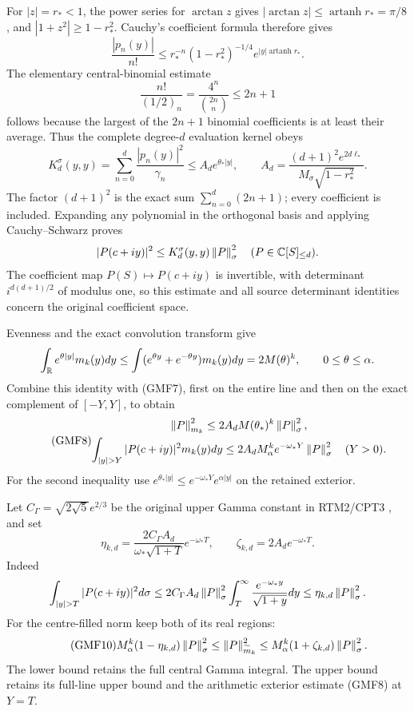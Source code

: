 For \(|z|=r_*<1\), the power series for \(\arctan z\) gives
\(|\arctan z|\le\operatorname{artanh}r_*=\pi/8\), and
\(|1+z^2|\ge1-r_*^2\).
Cauchy's coefficient formula therefore gives
\[
 \frac{|p_n(y)|}{n!}
 \le r_*^{-n}(1-r_*^2)^{-1/4}
                      e^{|y|\operatorname{artanh}r_*}.
\]
The elementary central-binomial estimate
\[
 \frac{n!}{(1/2)_n}=\frac{4^n}{\binom{2n}{n}}\le2n+1
\]
follows because the largest of the \(2n+1\) binomial coefficients
is at least their average.
Thus the complete degree-\(d\) evaluation kernel obeys
\begin{equation}\tag{GMF7}
 K_d^\sigma(y,y)=\sum_{n=0}^d\frac{|p_n(y)|^2}{\gamma_n}
 \le A_de^{\theta_*|y|},\qquad
 A_d=\frac{(d+1)^2 e^{2d\ell_*}}
               {M_\sigma\sqrt{1-r_*^2}}.
\end{equation}
The factor \((d+1)^2\) is the exact sum
\(\sum_{n=0}^d(2n+1)\); every coefficient is included.
Expanding any polynomial in the orthogonal basis and applying
Cauchy--Schwarz proves
\[
 |P(c+iy)|^2\le K_d^\sigma(y,y)\left\lVert P\right\rVert_\sigma^2
 \quad(P\in\mathbb C[S]_{\le d}).
\]
The coefficient map \(P(S)\mapsto P(c+iy)\) is invertible,
with determinant \(i^{d(d+1)/2}\) of modulus one, so this
estimate and all source determinant identities concern the
original coefficient space.

Evenness and the exact convolution transform give
\[
 \int_\mathbb R e^{\theta|y|}m_k(y)dy
 \le \int(e^{\theta y}+e^{-\theta y})m_k(y)dy
 =2M(\theta)^k,\qquad 0\le\theta\le\alpha.
\]
Combine this identity with (GMF7), first on the entire line
and then on the exact complement of \([-Y,Y]\), to obtain
\begin{equation}\tag{GMF8}
\begin{gathered}
 \norm P_{m_k}^2
 \le2A_dM(\theta_*)^k\norm P_\sigma^2,\\
 \int_{|y|>Y}|P(c+iy)|^2m_k(y)dy
 \le2A_dM_\alpha^k e^{-\omega_*Y}\norm P_\sigma^2
 \quad(Y>0).
\end{gathered}
\end{equation}
For the second inequality use
\(e^{\theta_*|y|}\le e^{-\omega_*Y}e^{\alpha|y|}\)
on the retained exterior.

Let \(C_\Gamma=\sqrt{2\sqrt5}e^{2/3}\) be the original upper
Gamma constant in RTM2/CPT3 \cite{a02gmf:providers,a02gmf:cpt}, and set
\begin{equation}\tag{GMF9}
 \eta_{k,d}=
 \frac{2C_\Gamma A_d}{\omega_*\sqrt{1+T}}e^{-\omega_*T},
 \qquad
 \zeta_{k,d}=2A_de^{-\omega_*T}.
\end{equation}
Indeed
\[
 \int_{|y|>T}|P(c+iy)|^2d\sigma
 \le2C_\Gamma A_d\norm P_\sigma^2
           \int_T^\infty\frac{e^{-\omega_*y}}{\sqrt{1+y}}dy
 \le\eta_{k,d}\norm P_\sigma^2.
\]
For the centre-filled norm keep both of its real regions:
\begin{equation}\tag{GMF10}
 M_\alpha^k(1-\eta_{k,d})\left\lVert P\right\rVert_\sigma^2
 \le\left\lVert P\right\rVert_{\widetilde m_k}^2
 \le M_\alpha^k(1+\zeta_{k,d})\left\lVert P\right\rVert_\sigma^2.
\end{equation}
The lower bound retains the full central Gamma integral.
The upper bound retains its full-line upper bound and the
arithmetic exterior estimate (GMF8) at \(Y=T\).

